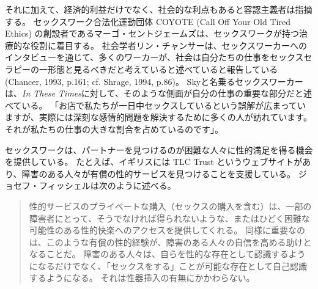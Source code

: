 \documentclass[paper=a4,book,openany]{jlreq}
\newcommand{\ig}[1]{}           %
\begin{document}
それに加えて、経済的利益だけでなく、社会的な利点もあると容認主義者は指摘する。
セックスワーク合法化運動団体 COYOTE (Call Off Your Old Tired Ethics) の創設者であるマーゴ・セントジェームズは、セックスワークが持つ治療的な役割に着目する。
社会学者リン・チャンサーは、セックスワーカーへのインタビューを通じて、多くのワーカーが、社会は自分たちの仕事をセックスセラピーの一形態と見るべきだと考えていると述べていると報告している(Chancer, 1993, p.161; cf. Shrage, 1994, p.86)。
\nocite{chancer93:_prost_femin_theor_ambiv}\nocite{shrage93:_moral_dilem_femin}
Skyと名乗るセックスワーカーは、\emph{In These Times}に対して、そのような側面が自分の仕事の重要な部分だと述べている。
「お店で私たちが一日中セックスしているという誤解が広まっていますが、実際には深刻な感情的問題を解決するために多くの人が訪れています。
それが私たちの仕事の大きな割合を占めているのです」\citep{weisman18:_when_sex_worker_do_labor_therap}。

セックスワークは、パートナーを見つけるのが困難な人々に性的満足を得る機会を提供している。
たとえば、イギリスには TLC Trust というウェブサイトがあり、障害のある人々が有償の性的サービスを見つけることを支援している\ig{\footnote{\url{http://tlc-trust.org.uk/}.}}。
ジョセフ・フィッシェルは次のように述べる。

\begin{quote}

性的サービスのプライベートな購入（セックスの購入を含む）は、一部の障害者にとって、そうでなければ得られないような、またはひどく困難な可能性のある性的快楽へのアクセスを提供してくれる。
同様に重要なのは、このような有償の性的経験が、障害のある人々の自信を高める助けとなることだ。
障害のある人々は、自らを性的な存在として認識するようになるだけでなく、「セックスをする」ことが可能な存在として自己認識するようになる。
それは性器挿入の有無にかかわらない。
\citep[p.220]{fischel18:screwconsent}
\end{quote}
\end{document}
